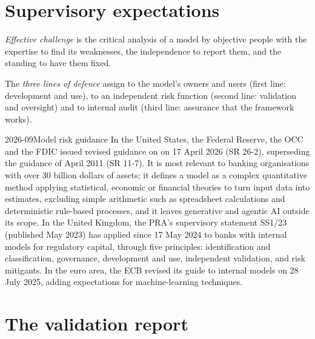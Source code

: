 \section{Supervisory expectations}

\begin{definition}\label{def:rc:model-risk-and-validation:challenge}
\emph{Effective challenge} is the critical analysis of a model by objective
people with the expertise to find its weaknesses, the independence to report them, and the standing
to have them fixed.
\end{definition}

\begin{definition}\label{def:rc:model-risk-and-validation:lines}
The \emph{three lines of defence} assign  to the model's
owners and users (first line: development and use), to an independent risk function (second line:
validation and oversight) and to internal audit (third line: assurance that the framework works).
\end{definition}

\begin{dated}{2026-09}{Model risk guidance}\label{dat:rc:model-risk-and-validation:rules}
In the United States, the Federal Reserve, the OCC and the FDIC issued revised guidance on  on 17 April 2026 (SR 26-2), superseding the guidance of April 2011 (SR 11-7). It is most
relevant to banking organisations with over 30 billion dollars of assets; it defines a model as a
complex quantitative method applying statistical, economic or financial theories to turn input data
into estimates, excluding simple arithmetic such as spreadsheet calculations and deterministic rule-based
processes, and it leaves generative and agentic AI outside its scope. In the United Kingdom, the PRA's
supervisory statement SS1/23 (published May 2023) has applied since 17 May 2024 to banks with internal
models for regulatory capital, through five principles: identification and classification, governance,
development and use, independent validation, and risk mitigants. In the euro area, the ECB revised its
guide to internal models on 28 July 2025, adding expectations for machine-learning techniques.
\end{dated}

\section{The validation report}

